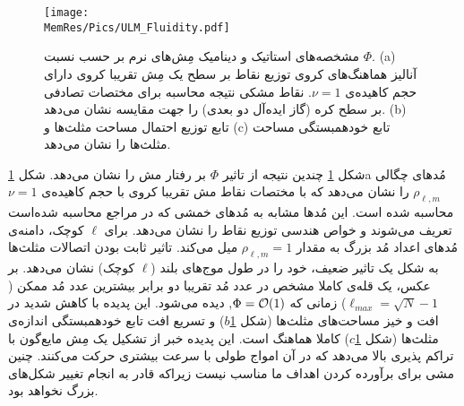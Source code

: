 \begin{figure}[ht]
\begin{center}
\texttt{[image: \\MemRes/Pics/ULM\_Fluidity.pdf]}
\caption{
مشخصه‌های استاتیک و دینامیک مِش‌های نرم بر حسب نسبت
$\Phi$. (a)
آنالیز هماهنگ‌های کروی توزیع نقاط بر سطح یک مِش تقریبا کروی دارای حجم کاهیده‌ی 
$\nu=1$.
 نقاط مشکی نتیجه محاسبه برای مختصات تصادفی بر سطح کره (گاز ایده‌آل دو بعدی) را جهت مقایسه نشان می‌دهد. 
(b)
تابع توزیع احتمال مساحت مثلث‌ها و 
(c)
تابع خودهمبستگی مساحت مثلث‌ها را نشان می‌دهد.
}
\label{fig:vertexULM}
\end{center}
\end{figure}

شکل
\ref{fig:vertexULM}
چندین نتیجه از تاثیر 
 $\Phi$
بر رفتار مش را نشان می‌دهد. شکل 
\ref{fig:vertexULM}a
 مُد‌های چگالی
$\rho_{\ell,m}$
را نشان می‌دهد که با مختصات نقاط مش تقریبا کروی با حجم کاهیده‌ی 
$\nu=1$
محاسبه‌ شده است. این مُد‌ها مشابه به مُد‌های خمشی که در مراجع 
\cite{safran1983, milnersafranPRA1987}
محاسبه شده‌است تعریف می‌شوند و خواص هندسی توزیع نقاط را نشان می‌دهد. برای 
$\ell$
کوچک، دامنه‌ی مُد‌های اعداد مُد بزرگ به مقدار
$\rho_{\ell,m}=1$
میل می‌کند. تاثیر ثابت بودن اتصالات مثلث‌ها به شکل یک تاثیر ضعیف، خود را در طول‌ موج‌های بلند 
($\ell$
کوچک) نشان می‌دهد. بر عکس، یک قله‌ی کاملا مشخص در عدد مُد تقریبا دو برابر بیشترین عدد مُد ممکن 
($\ell_{max}=\sqrt{N}-1$)
 زمانی که 
$\Phi = {\cal O}(1)$,
دیده می‌شود. این پدیده با کاهش شدید در افت و خیز مساحت‌های مثلث‌ها  (شکل
\ref{fig:vertexULM}$b$)
و تسریع افت تابع خودهمبستگی اندازه‌ی مثلث‌ها (شکل
\ref{fig:vertexULM}$c$)
 کاملا هماهنگ است. این پدیده خبر از تشکیل یک مِش مایع‌گون با تراکم پذیری بالا می‌دهد که در آن امواج طولی با سرعت بیشتری حرکت می‌کنند. چنین مشی برای برآورده کردن اهداف ما مناسب نیست زیراکه قادر به انجام تغییر شکل‌های بزرگ نخواهد بود.












